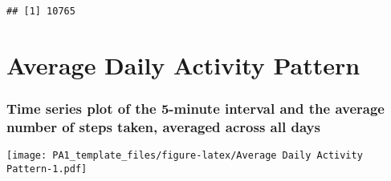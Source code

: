 \documentclass[
]{article}
\newenvironment{Shaded}{\begin{snugshade}}{\end{snugshade}}
\newcommand{\DataTypeTok}[1]{\textcolor[rgb]{0.13,0.29,0.53}{#1}}
\newcommand{\KeywordTok}[1]{\textcolor[rgb]{0.13,0.29,0.53}{\textbf{#1}}}
\newcommand{\NormalTok}[1]{#1}
\newcommand{\OperatorTok}[1]{\textcolor[rgb]{0.81,0.36,0.00}{\textbf{#1}}}
\newcommand{\OtherTok}[1]{\textcolor[rgb]{0.56,0.35,0.01}{#1}}
\newcommand{\StringTok}[1]{\textcolor[rgb]{0.31,0.60,0.02}{#1}}
\begin{document}
\begin{Shaded}
\end{Shaded}

\begin{verbatim}
## [1] 10765
\end{verbatim}

\hypertarget{average-daily-activity-pattern}{%
\section{Average Daily Activity
Pattern}\label{average-daily-activity-pattern}}

\hypertarget{time-series-plot-of-the-5-minute-interval-and-the-average-number-of-steps-taken-averaged-across-all-days}{%
\subsubsection{Time series plot of the 5-minute interval and the average
number of steps taken, averaged across all
days}\label{time-series-plot-of-the-5-minute-interval-and-the-average-number-of-steps-taken-averaged-across-all-days}}

\begin{Shaded}
\end{Shaded}

\texttt{[image: PA1\_template\_files/figure-latex/Average Daily Activity Pattern-1.pdf]}

\begin{Shaded}
\end{Shaded}
\end{document}
